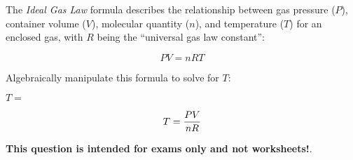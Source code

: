 

The {\it Ideal Gas Law} formula describes the relationship between gas pressure ($P$), container volume ($V$), molecular quantity ($n$), and temperature ($T$) for an enclosed gas, with $R$ being the ``universal gas law constant'':

$$PV = nRT$$

Algebraically manipulate this formula to solve for $T$:

\vskip 20pt

$T = $







$$T = {PV \over nR}$$







{\bf This question is intended for exams only and not worksheets!}.



